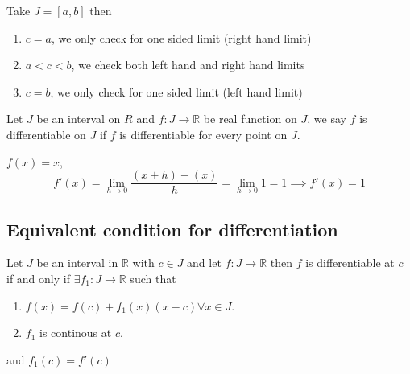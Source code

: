 \documentclass[11pt,a4paper]{colorart}
\def\R{\mathbb{R}}
\def\ra{\rightarrow}
\begin{document}
\begin{remark}
	Take $J = [a,b]$ then
	\begin{enumerate}
		\item $c=a$, we only check for one sided limit (right hand limit)
		\item $a<c<b$, we check both left hand and right hand limits
		\item $c=b$, we only check for one sided limit (left hand limit)
	\end{enumerate}
\end{remark}

\begin{definition}
	Let $J$ be an interval on $R$ and $f:J \ra \R$ be real function on $J$, we say $f$ is differentiable on $J$ if $f$ is differentiable for every point on $J$.
\end{definition}

\begin{example}
	$f(x) = x$, 
	\[ f'(x) = \lim_{h \to 0} \frac{ (x+h) - (x) }{ h} 
	   = \lim_{h \to 0} 1 = 1 \implies f'(x) = 1 \]
\end{example}

\subsection{Equivalent condition for differentiation}

\begin{theorem}
	Let $J$ be an interval in $\R$ with $c \in J$ and let $f:J \ra \R$ then $f$ is differentiable at $c$ if and only if $\exists f_1:J \ra \R$ such that
	\begin{enumerate}
		\item $f(x) = f(c) + f_1(x)  (x-c) \forall x \in J$.
		\item $f_1$ is continous at $c$.
	\end{enumerate}
	and $f_1(c) = f'(c)$
\end{theorem}
\end{document}
